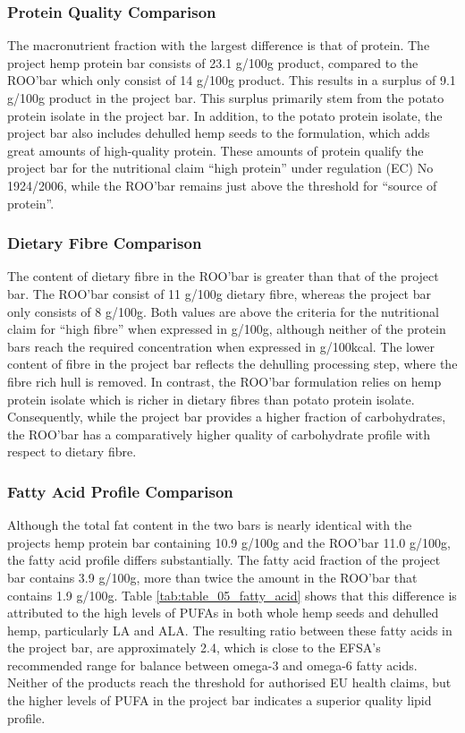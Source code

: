 \subsubsection{Protein Quality Comparison}
The macronutrient fraction with the largest difference is that of protein. The project hemp protein bar consists of 23.1 g/100g product, compared to the ROO’bar which only consist of 14 g/100g product. This results in a surplus of 9.1 g/100g product in the project bar. This surplus primarily stem from the potato protein isolate in the project bar. In addition, to the potato protein isolate, the project bar also includes dehulled hemp seeds to the formulation, which adds great amounts of high-quality protein. These amounts of protein qualify the project bar for the nutritional claim “high protein” under regulation (EC) No 1924/2006, while the ROO’bar remains just above the threshold for “source of protein”.

\subsubsection{Dietary Fibre Comparison}
The content of dietary fibre in the ROO’bar is greater than that of the project bar. The ROO’bar consist of 11 g/100g dietary fibre, whereas the project bar only consists of 8 g/100g. Both values are above the criteria for the nutritional claim for “high fibre” when expressed in g/100g, although neither of the protein bars reach the required concentration when expressed in g/100kcal. The lower content of fibre in the project bar reflects the dehulling processing step, where the fibre rich hull is removed. In contrast, the ROO’bar formulation relies on hemp protein isolate which is richer in dietary fibres than potato protein isolate. Consequently, while the project bar provides a higher fraction of carbohydrates, the ROO’bar has a comparatively higher quality of carbohydrate profile with respect to dietary fibre. 

\subsubsection{Fatty Acid Profile Comparison}
Although the total fat content in the two bars is nearly identical with the projects hemp protein bar containing 10.9 g/100g and the ROO’bar 11.0 g/100g, the fatty acid profile differs substantially. The fatty acid fraction of the project bar contains 3.9 g/100g, more than twice the amount in the ROO’bar that contains 1.9 g/100g. Table \ref*{tab:table_05_fatty_acid} shows that this difference is attributed to the high levels of PUFAs in both whole hemp seeds and dehulled hemp, particularly LA and ALA. The resulting ratio between these fatty acids in the project bar, are approximately 2.4, which is close to the EFSA’s recommended range for balance between omega-3 and omega-6 fatty acids. Neither of the products reach the threshold for authorised EU health claims, but the higher levels of PUFA in the project bar indicates a superior quality lipid profile.

